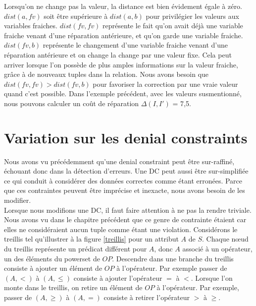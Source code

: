 \documentclass[letterpaper, 12pt]{report}
\theoremstyle{definition}
\begin{document}
Lorsqu'on ne change pas la valeur, la distance est bien évidement égale à zéro. $dist(a,fv)$ soit être supérieure à $dist(a,b)$ pour privilégier les valeurs aux variables fraiches. $dist(fv,fv)$ représente le fait qu'on avait déjà une variable fraiche venant d'une réparation antérieure, et qu'on garde une variable fraiche. $dist(fv,b)$ représente le changement d'une variable fraiche venant d'une réparation antérieure et on change la change par une valeur fixe. Cela peut arriver lorsque l'on possède de plus amples informations sur la valeur fraiche, grâce à de nouveaux tuples dans la relation. Nous avons besoin que $dist(fv,fv) > dist(fv,b)$ pour favoriser la correction par une vraie valeur quand c'est possible. Dans l'exemple précédent, avec les valeurs susmentionné, nous pouvons calculer un coût de réparation $\Delta(I,I')$ = 7,5.


\section{Variation sur les denial constraints}

Nous avons vu précédemment qu'une denial constraint peut être sur-raffiné, échouant donc dans la détection d'erreurs. Une DC peut aussi être sur-simplifiée ce qui conduit à considérer des données correctes comme étant erronées. Parce que ces contraintes peuvent être imprécise et inexacte, nous avons besoin de les modifier.\\

Lorsque nous modifions une DC, il faut faire attention à ne pas la rendre triviale. Nous avons vu dans le chapitre précédent que ce genre de contrainte étaient car elles ne considéraient aucun tuple comme étant une violation. Considérons le treillis tel qu'illustrer à la figure \ref{treillis} pour un attribut $A$ de $S$. Chaque nœud du treillis représente un prédicat différent pour $A$, donc $A$ associé à un opérateur, un des éléments du powerset de $OP$. Descendre dans une branche du treillis consiste à ajouter un élément de $OP$ à l'opérateur. Par exemple passer de $(A,<)$ à $(A,\leq)$ consiste à ajouter l'opérateur $=$ à $<$. Lorsque l'on monte dans le treillis, on retire un élément de $OP$ à l'opérateur. Par exemple, passer de $(A, \geq)$ à $(A,=)$ consiste à retirer l'opérateur $>$ à $\geq$.\\
\end{document}
